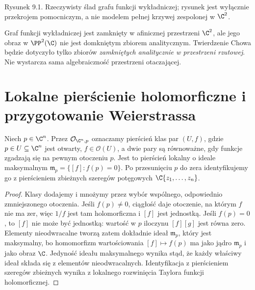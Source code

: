 \begin{center}

{\small Rysunek 9.1. Rzeczywisty ślad grafu funkcji wykładniczej;
rysunek jest wyłącznie przekrojem pomocniczym, a nie modelem
pełnej krzywej zespolonej w $\C^2$.}\par
\end{center}

\begin{uwaga}
Graf funkcji wykładniczej jest zamknięty w afinicznej przestrzeni
$\C^2$, ale jego obraz w $\PP^2(\C)$ nie jest domkniętym zbiorem
analitycznym. Twierdzenie Chowa będzie dotyczyło tylko zbiorów
\emph{zamkniętych analitycznie w przestrzeni rzutowej}.
Nie wystarcza sama algebraiczność przestrzeni otaczającej.
\end{uwaga}

\section{Lokalne pierścienie holomorficzne i przygotowanie Weierstrassa}
\label{sec:ga9-lokalne}

\begin{definicja}
Niech $p\in\C^n$. Przez $\mathcal O_{\C^n,p}$ oznaczamy pierścień
klas par $(U,f)$, gdzie $p\in U\subseteq\C^n$ jest otwarty,
$f\in\mathcal O(U)$, a dwie pary są równoważne, gdy funkcje
zgadzają się na pewnym otoczeniu $p$. Jest to pierścień lokalny
o ideale maksymalnym $\mathfrak m_p=\{[f]:f(p)=0\}$.
Po przesunięciu $p$ do zera identyfikujemy go z pierścieniem
zbieżnych szeregów potęgowych $\C\{z_1,\ldots,z_n\}$.
\end{definicja}

\begin{proof}
Klasy dodajemy i mnożymy przez wybór wspólnego, odpowiednio
zmniejszonego otoczenia. Jeśli $f(p)\ne0$, ciągłość daje
otoczenie, na którym $f$ nie ma zer, więc $1/f$ jest tam
holomorficzna i $[f]$ jest jednostką. Jeśli $f(p)=0$,
to $[f]$ nie może być jednostką: wartość w $p$ iloczynu
$[f][g]$ jest równa zero. Elementy nieodwracalne tworzą
zatem dokładnie ideał $\mathfrak m_p$, który jest maksymalny,
bo homomorfizm wartościowania $[f]\mapsto f(p)$ ma jako
jądro $\mathfrak m_p$ i jako obraz $\C$. Jedyność ideału
maksymalnego wynika stąd, że każdy właściwy ideał składa się
z elementów nieodwracalnych. Identyfikacja z pierścieniem
szeregów zbieżnych wynika z lokalnego rozwinięcia Taylora
funkcji holomorficznej.
\end{proof}

